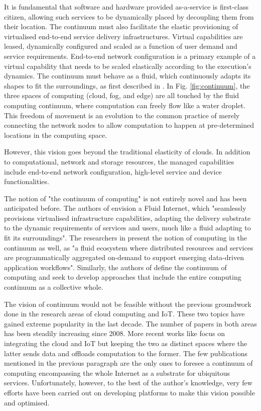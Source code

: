 It is fundamental that software and hardware provided as-a-service is first-class citizen, allowing such services to be dynamically placed by decoupling them from their location. The continuum must also facilitate the elastic provisioning of virtualised end-to-end service delivery infrastructures. Virtual capabilities are leased, dynamically configured and scaled as a function of user demand and service requirements. End-to-end network configuration is a primary example of a virtual capability that needs to be scaled elastically according to the execution's dynamics. The continuum must behave as a fluid, which continuously adapts its shapes to fit the surroundings, as first described in \cite{latre2014fluid}. In Fig. \ref{fig:continuum}, the three spaces of computing (cloud, fog, and edge) are all touched by the fluid computing continuum, where computation can freely flow like a water droplet. This freedom of movement is an evolution to the common practice of merely connecting the network nodes to allow computation to happen at pre-determined locations in the computing space.

However, this vision goes beyond the traditional elasticity of clouds. In addition to computational, network and storage resources, the managed capabilities include end-to-end network configuration, high-level service and device functionalities.

The notion of "the continuum of computing" is not entirely novel and has been anticipated before. The authors of \cite{latre2014fluid} envision a Fluid Internet, which "seamlessly provisions virtualised infrastructure capabilities, adapting the delivery substrate to the dynamic requirements of services and users, much like a fluid adapting to fit its surroundings". The researchers in \cite{abdelbaky2017computing} present the notion of computing in the continuum as well, as "a fluid ecosystem where distributed resources and services are programmatically aggregated on-demand to support emerging data-driven application workflows". Similarly, the authors of \cite{beckman2020harnessing} define the continuum of computing and seek to develop approaches that include the entire computing continuum as a collective whole.

The vision of continuum would not be feasible without the previous groundwork done in the research areas of cloud computing and IoT. These two topics have gained extreme popularity in the last decade. The number of papers in both areas has been steadily increasing since 2008. More recent works like \cite{botta2016integration} focus on integrating the cloud and IoT but keeping the two as distinct spaces where the latter sends data and offloads computation to the former. The few publications mentioned in the previous paragraph are the only ones to foresee a continuum of computing encompassing the whole Internet as a substrate for ubiquitous services. Unfortunately, however, to the best of the author's knowledge, very few efforts have been carried out on developing platforms to make this vision possible and optimised.

